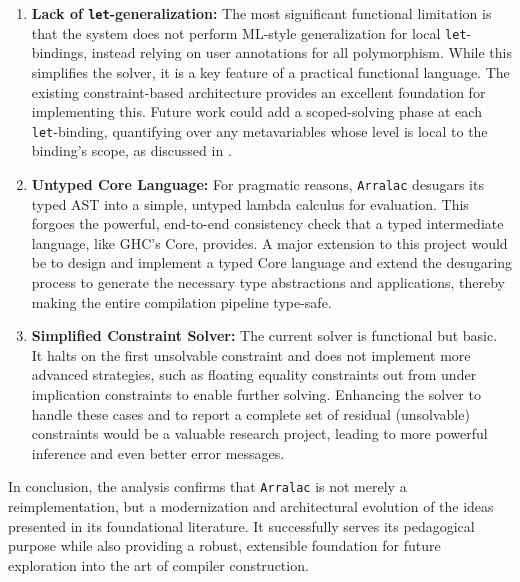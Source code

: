 \begin{enumerate}
    \item \textbf{Lack of \texttt{let}-generalization:} The most significant functional limitation is that the system does not perform ML-style generalization for local \texttt{let}-bindings, instead relying on user annotations for all polymorphism. While this simplifies the solver, it is a key feature of a practical functional language. The existing constraint-based architecture provides an excellent foundation for implementing this. Future work could add a scoped-solving phase at each \texttt{let}-binding, quantifying over any metavariables whose level is local to the binding's scope, as discussed in \cite{wits-type-inference-using-constraints}.

    \item \textbf{Untyped Core Language:} For pragmatic reasons, \texttt{Arralac} desugars its typed AST into a simple, untyped lambda calculus for evaluation. This forgoes the powerful, end-to-end consistency check that a typed intermediate language, like GHC's Core, provides. A major extension to this project would be to design and implement a typed Core language and extend the desugaring process to generate the necessary type abstractions and applications, thereby making the entire compilation pipeline type-safe.

    \item \textbf{Simplified Constraint Solver:} The current solver is functional but basic. It halts on the first unsolvable constraint and does not implement more advanced strategies, such as floating equality constraints out from under implication constraints to enable further solving. Enhancing the solver to handle these cases and to report a complete set of residual (unsolvable) constraints would be a valuable research project, leading to more powerful inference and even better error messages.
\end{enumerate}

In conclusion, the analysis confirms that \texttt{Arralac} is not merely a reimplementation, but a modernization and architectural evolution of the ideas presented in its foundational literature. It successfully serves its pedagogical purpose while also providing a robust, extensible foundation for future exploration into the art of compiler construction.